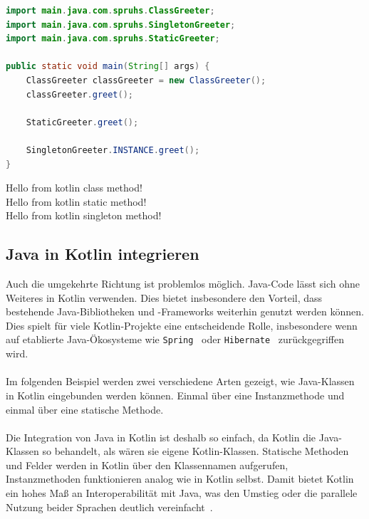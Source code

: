 \documentclass[11pt]{article}
\begin{document}
    \begin{lstlisting}[language=Java, caption={Main.java}]
import main.java.com.spruhs.ClassGreeter;
import main.java.com.spruhs.SingletonGreeter;
import main.java.com.spruhs.StaticGreeter;

public static void main(String[] args) {
    ClassGreeter classGreeter = new ClassGreeter();
    classGreeter.greet();

    StaticGreeter.greet();

    SingletonGreeter.INSTANCE.greet();
}
    \end{lstlisting}

    \begin{tcolorbox}[colback=black!5!white, colframe=black, title=Ausgabe]
        Hello from kotlin class method!\\
        Hello from kotlin static method!\\
        Hello from kotlin singleton method!
    \end{tcolorbox}
    
    \subsection{Java in Kotlin integrieren}
    Auch die umgekehrte Richtung ist problemlos möglich.
    Java-Code lässt sich ohne Weiteres in Kotlin verwenden.
    Dies bietet insbesondere den Vorteil, dass bestehende Java-Bibliotheken und -Frameworks weiterhin genutzt werden können.
    Dies spielt für viele Kotlin-Projekte eine entscheidende Rolle, insbesondere wenn auf etablierte Java-Ökosysteme wie \texttt{Spring}~\cite{spring} oder \texttt{Hibernate}~\cite{hibernate} zurückgegriffen wird.\\
    \\
    Im folgenden Beispiel werden zwei verschiedene Arten gezeigt, wie Java-Klassen in Kotlin eingebunden werden können.
    Einmal über eine Instanzmethode und einmal über eine statische Methode.\\
    \\
    Die Integration von Java in Kotlin ist deshalb so einfach, da Kotlin die Java-Klassen so behandelt, als wären sie eigene Kotlin-Klassen.
    Statische Methoden und Felder werden in Kotlin über den Klassennamen aufgerufen, Instanzmethoden funktionieren analog wie in Kotlin selbst.
    Damit bietet Kotlin ein hohes Maß an Interoperabilität mit Java, was den Umstieg oder die parallele Nutzung beider Sprachen deutlich vereinfacht~\cite{kotlin-java-in-kotlin}.\\
    \\
\end{document}
